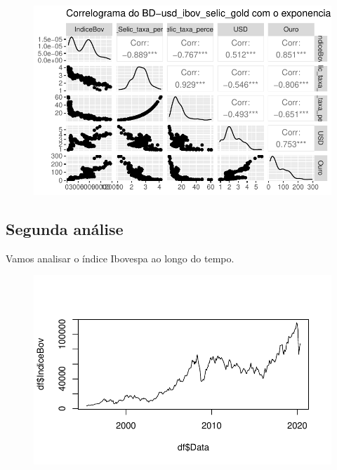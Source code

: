 \documentclass[
  letterpaper,
  DIV=11,
  numbers=noendperiod]{scrartcl}
\newenvironment{Shaded}{\begin{snugshade}}{\end{snugshade}}
\newcommand{\AttributeTok}[1]{\textcolor[rgb]{0.40,0.45,0.13}{#1}}
\newcommand{\FunctionTok}[1]{\textcolor[rgb]{0.28,0.35,0.67}{#1}}
\newcommand{\NormalTok}[1]{\textcolor[rgb]{0.00,0.23,0.31}{#1}}
\newcommand{\SpecialCharTok}[1]{\textcolor[rgb]{0.37,0.37,0.37}{#1}}
\newcommand{\StringTok}[1]{\textcolor[rgb]{0.13,0.47,0.30}{#1}}
\begin{document}
\begin{figure}[H]

{\centering \includegraphics{DemonstracaoStrucchange_files/figure-pdf/unnamed-chunk-8-1.pdf}

}

\end{figure}

\hypertarget{segunda-anuxe1lise}{%
\subsection{Segunda análise}\label{segunda-anuxe1lise}}

Vamos analisar o índice Ibovespa ao longo do tempo.

\begin{Shaded}
\end{Shaded}

\begin{figure}[H]

{\centering \includegraphics{DemonstracaoStrucchange_files/figure-pdf/unnamed-chunk-10-1.pdf}

}

\end{figure}
\end{document}
